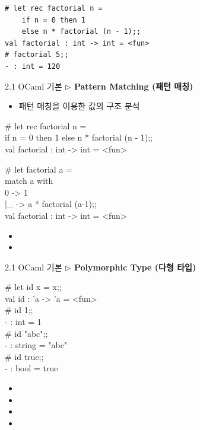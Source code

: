 \documentclass[10pt, xcolor=dvipsnames]{beamer}
\begin{document}
\begin{lstlisting}[style=zsh]
# let rec factorial n =
	if n = 0 then 1
	else n * factorial (n - 1);;    
val factorial : int -> int = <fun>
# factorial 5;;
- : int = 120
\end{lstlisting}
	\newpage
	\begin{frame}{2.1 OCaml 기본}
		\textbf{$\triangleright$ Pattern Matching (패턴 매칭)}
		
		\begin{itemize}
			\item 패턴 매칭을 이용한 값의 구조 분석
		\end{itemize}
		\begin{tcolorbox}[colback=backcolor]\ttfamily
		\# let rec factorial n =\\
			if n = 0 then 1 else n * factorial (n - 1);; \\   
		val factorial : int -> int = <fun>
		\end{tcolorbox}
		\begin{tcolorbox}[colback=backcolor]\ttfamily
			\# let factorial a = \\
			match a with\\
			0 -> 1\\
			|\_ -> a * factorial (a-1);;\\
			val factorial : int -> int = <fun>
		\end{tcolorbox}
		\begin{itemize}
			\item[]
			\item[]
		\end{itemize}
	\end{frame}

	\begin{frame}{2.1 OCaml 기본}
		\textbf{$\triangleright$ Polymorphic Type (다형 타입)}
		
		\begin{tcolorbox}[colback=backcolor]\ttfamily
			\# let id x = x;; \\
			val id : 'a -> 'a = <fun> \\
			\# id 1;; \\
			- : int = 1 \\
			\# id "abc";; \\
			- : string = "abc" \\
			\# id true;; \\
			- : bool = true
		\end{tcolorbox}
		\begin{itemize}
			\item[]
			\item[]
			\item[]
			\item[]
		\end{itemize}
	\end{frame}
	
\end{document}
